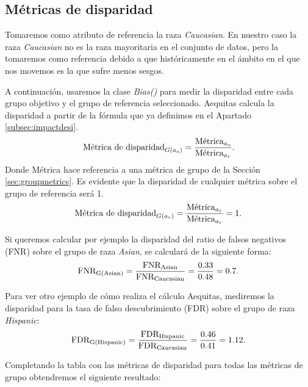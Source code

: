 \subsection*{Métricas de disparidad}

Tomaremos como atributo de referencia la raza \textit{Caucasian}. En nuestro caso la raza \textit{Caucasian} no es la raza mayoritaria en el conjunto de datos, pero la tomaremos como referencia debido a que históricamente en el ámbito en el que nos movemos es la que sufre menos sesgos.

A continuación, usaremos la clase \textit{Bias()} para medir la disparidad entre cada grupo objetivo y el grupo de referencia seleccionado. Aequitas calcula la disparidad a partir de la fórmula que ya definimos en el Apartado \ref{subsec:impactdesi}. $$\text{Métrica de disparidad}_{G(a_o)}=\frac{\displaystyle \text{Métrica}_{a_o}}{\displaystyle \text{Métrica}_{a_r}}.$$ Donde Métrica hace referencia a una métrica de grupo de la Sección \ref{sec:groupmetrics}. Es evidente que la disparidad de cualquier métrica sobre el grupo de referencia será 1. $$\text{Métrica de disparidad}_{G(a_r)}=\frac{\displaystyle \text{Métrica}_{a_r}}{\displaystyle \text{Métrica}_{a_r}}=1.$$

Si queremos calcular por ejemplo la disparidad del ratio de falsos negativos (FNR) sobre el grupo de raza \textit{Asian}, se calculará de la siguiente forma: $$\text{FNR}_{\text{G(Asian)}}=\frac{\displaystyle \text{FNR}_{\text{Asian}}}{\displaystyle \text{FNR}_{\text{Caucasian}}}=\frac{\displaystyle 0.33}{\displaystyle 0.48}=0.7.$$

Para ver otro ejemplo de cómo realiza el cálculo Aequitas, mediremos la disparidad para la tasa de falso descubrimiento (FDR) sobre el grupo de raza \textit{Hispanic}:
$$\text{FDR}_{\text{G(Hispanic)}}=\frac{\displaystyle \text{FDR}_{\text{Hispanic}}}{\displaystyle \text{FDR}_{\text{Caucasian}}}=\frac{\displaystyle 0.46}{\displaystyle 0.41}=1.12.$$

Completando la tabla con las métricas de disparidad para todas las métricas de grupo obtendremos el siguiente resultado:

